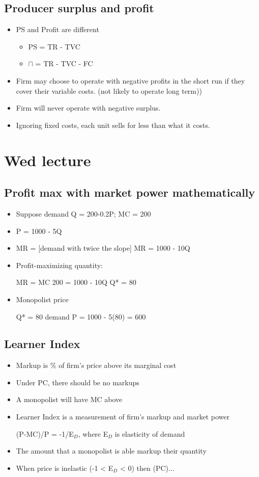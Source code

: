 \documentclass{article}
\begin{document}
\subsection{Producer surplus and profit}
\begin{itemize}
  \item PS and Profit are different
    \begin{itemize}
      \item PS = TR - TVC
      \item $\sqcap$ = TR - TVC - FC
    \end{itemize}
  \item Firm may choose to operate with negative profits in the short run if they cover their variable costs.
    (not likely to operate long term))
  \item Firm will never operate with negative surplus.
  \item Ignoring fixed costs, each unit sells for less than what it costs.
\end{itemize}

\section{Wed lecture}

\subsection{Profit max with market power mathematically}
\begin{itemize}
  \item Suppose demand Q = 200-0.2P; MC = 200
  \item P = 1000 - 5Q
  \item MR = [demand with twice the slope] \rightarrow{} MR = 1000 - 10Q
  \item Profit-maximizing quantity:

    MR = MC \rightarrow{} 200 = 1000 - 10Q \rightarrow{} Q* = 80
  \item Monopolist price

    Q* = 80 \rightarrow{} demand \rightarrow{} P = 1000 - 5(80) = 600
\end{itemize}

\subsection{Learner Index}
\begin{itemize}
  \item Markup is \% of firm's price above its marginal cost
  \item Under PC, there should be no markups
  \item A monopolist will have MC above
  \item Learner Index is a measurement of firm's markup and market power

    (P-MC)/P = -1/E$_D$, where E$_D$ is elasticity of demand
  \item The amount that a monopolist is able markup their quantity
  \item When price is inelastic (-1 < E$_D$ < 0) then (PC)...
\end{itemize}
\end{document}

